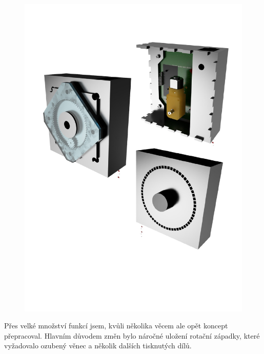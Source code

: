 \begin{figure}[htbp]
    \centering
    \includegraphics[width=\textwidth]{kapitoly/obrazky/E3/rendery.pdf}
    \label{fig:M1}
\end{figure}

Přes velké množství funkcí jsem, kvůli několika věcem ale opět koncept přepracoval. Hlavním důvodem změn bylo náročné uložení rotační západky, 
které vyžadovalo ozubený věnec a několik dalších tisknutých dílů.

\newpage